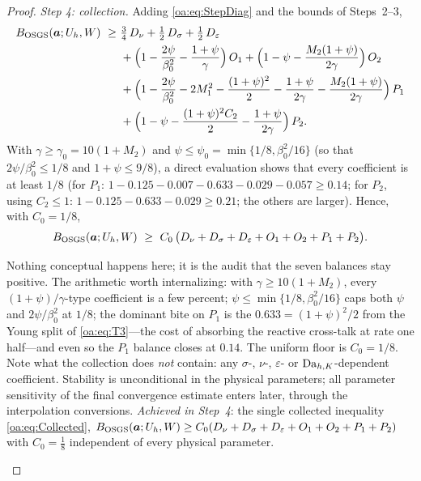 \begin{proof}
\medskip\noindent\emph{Step 4: collection.}
Adding \cref{oa:eq:StepDiag} and the bounds of Steps~2--3,
\begin{align*}
  B_{\mathrm{OSGS}}(\boldsymbol{a}; U_h, W)
  \ \ge\ & \tfrac34\, D_\nu + \tfrac12\, D_\sigma + \tfrac12\, D_\varepsilon\\
  &+ \Bigl( 1 - \frac{2\psi}{\beta_0^2} - \frac{1+\psi}{\gamma} \Bigr)\, O_1
  + \Bigl( 1 - \psi - \frac{M_2(1+\psi)}{2\gamma} \Bigr)\, O_2\\
  &+ \Bigl( 1 - \frac{2\psi}{\beta_0^2} - 2M_1^2 - \frac{(1+\psi)^2}{2}
  - \frac{1+\psi}{2\gamma} - \frac{M_2(1+\psi)}{2\gamma} \Bigr)\, P_1\\
  &+ \Bigl( 1 - \psi - \frac{(1+\psi)^2 C_2}{2} - \frac{1+\psi}{2\gamma} \Bigr)\, P_2 .
\end{align*}
With $\gamma \ge \gamma_0 = 10(1+M_2)$ and
$\psi \le \psi_0 = \min\{1/8, \beta_0^2/16\}$ (so that $2\psi/\beta_0^2 \le 1/8$ and
$1+\psi \le 9/8$), a direct evaluation shows that every coefficient is at least
$1/8$ (for $P_1$: $1 - 0.125 - 0.007 - 0.633 - 0.029 - 0.057 \ge 0.14$; for $P_2$,
using $C_2 \le 1$: $1 - 0.125 - 0.633 - 0.029 \ge 0.21$; the others are larger).
Hence, with $C_0 = 1/8$,
\begin{equation}
  \label{oa:eq:Collected}
  B_{\mathrm{OSGS}}(\boldsymbol{a}; U_h, W)
  \ \ge\ C_0\,\bigl( D_\nu + D_\sigma + D_\varepsilon + O_1 + O_2 + P_1 + P_2 \bigr).
\end{equation}

\begin{pedagogy}
Nothing conceptual happens here; it is the audit that the seven balances stay
positive. The arithmetic worth internalizing: with $\gamma \ge 10(1+M_2)$,
every $(1+\psi)/\gamma$-type coefficient is a few percent;
$\psi \le \min\{1/8,\beta_0^2/16\}$ caps both $\psi$ and $2\psi/\beta_0^2$ at
$1/8$; the dominant bite on $P_1$ is the $0.633 = (1+\psi)^2/2$ from the Young
split of \cref{oa:eq:T3}---the cost of absorbing the reactive cross-talk at
rate one half---and even so the $P_1$ balance closes at $0.14$. The uniform
floor is $C_0 = 1/8$. Note what the collection does \emph{not} contain: any
$\sigma$-, $\nu$-, $\varepsilon$- or $\mathrm{Da}_{h,K}$-dependent coefficient. Stability is
unconditional in the physical parameters; all parameter sensitivity of the
final convergence estimate enters later, through the interpolation
conversions.
\emph{Achieved in Step~4}: the single collected inequality \cref{oa:eq:Collected},
$B_{\mathrm{OSGS}}(\boldsymbol{a};U_h,W)\ge C_0(D_\nu+D_\sigma+D_\varepsilon+O_1+O_2+P_1+P_2)$
with $C_0=\tfrac18$ independent of every physical parameter.
\end{pedagogy}


\end{proof}
